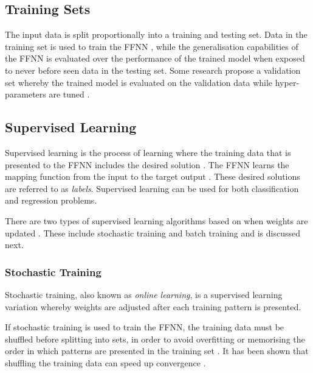 \subsection{Training Sets}
\label{sec:anns:training:sets}

The input data is split proportionally into a training and testing set. Data in
the training set is used to train the \ac{FFNN} \cite{ref:james:2013}, while the
generalisation capabilities of the \ac{FFNN} is evaluated over the performance
of the trained model when exposed to never before seen data in the testing set.
Some research propose a validation set whereby the trained model is evaluated on
the validation data while hyper-parameters are tuned \cite{ref:brownlee:2017}.


\subsection{Supervised Learning}
\label{sec:anns:training:supervised_learning}

Supervised learning is the process of learning where
the training data that is presented to the \ac{FFNN} includes the desired
solution \cite{ref:geron:2017}.  The \ac{FFNN} learns the mapping function from
the input to the target output \cite{ref:brownlee:2016}. These desired solutions
are referred to as \textit{labels}. Supervised
learning can be used for both classification and regression problems.

There are two types of supervised learning algorithms based on when weights are
updated \cite{ref:engelbrecht:2007}. These include stochastic training and batch
training and is discussed next.


\subsubsection{Stochastic Training}
\label{sec:anns:training:stochastic}

Stochastic training, also known as \textit{online learning}, is a supervised
learning variation whereby weights are adjusted after each training pattern is
presented.

If stochastic training is used to train the
\ac{FFNN}, the training data must be shuffled before splitting into sets, in
order to avoid overfitting or memorising the order in which patterns are
presented in the training set \cite{ref:engelbrecht:2007}. It has been shown
that shuffling the training data can speed up convergence
\cite{ref:bengio:2012}. 


